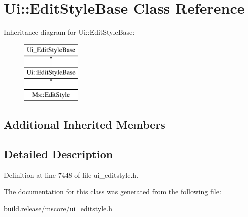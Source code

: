 \hypertarget{class_ui_1_1_edit_style_base}{}\section{Ui\+:\+:Edit\+Style\+Base Class Reference}
\label{class_ui_1_1_edit_style_base}
Inheritance diagram for Ui\+:\+:Edit\+Style\+Base\+:\begin{figure}[H]
\begin{center}
\leavevmode
\includegraphics[height=3.000000cm]{class_ui_1_1_edit_style_base}
\end{center}
\end{figure}
\subsection*{Additional Inherited Members}


\subsection{Detailed Description}


Definition at line 7448 of file ui\+\_\+editstyle.\+h.



The documentation for this class was generated from the following file\+:\begin{DoxyCompactItemize}
\item 
build.\+release/mscore/ui\+\_\+editstyle.\+h\end{DoxyCompactItemize}
